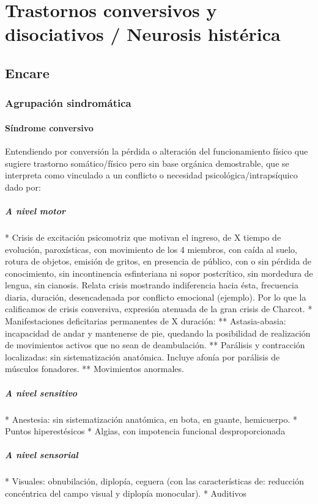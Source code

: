 \chapter*{Trastornos conversivos y disociativos / Neurosis histérica}
\section*{Encare}
\subsection*{Agrupación sindromática}
\subsubsection*{Síndrome conversivo}
Entendiendo por conversión la pérdida o alteración del funcionamiento físico que sugiere trastorno somático/físico pero sin base orgánica demostrable, que se interpreta como vinculado a un conflicto o necesidad psicológica/intrapsíquico dado por:
\paragraph{A nivel motor}
* Crisis de excitación psicomotriz que motivan el ingreso, de X tiempo de evolución, paroxísticas, con movimiento de los 4 miembros, con caída al suelo, rotura de objetos, emisión de gritos, en presencia de público, con o sin pérdida de conocimiento, sin incontinencia esfinteriana ni sopor postcrítico, sin mordedura de lengua, sin cianosis. Relata crisis mostrando indiferencia hacia ésta, frecuencia diaria, duración, desencadenada por conflicto emocional (ejemplo). Por lo que la calificamos de crisis conversiva, expresión atenuada de la gran crisis de Charcot.
* Manifestaciones deficitarias permanentes de X duración:
** Astasia-abasia: incapacidad de andar y mantenerse de pie, quedando la posibilidad de realización de movimientos activos que no sean de deambulación.
** Parálisis y contracción localizadas: sin sistematización anatómica. Incluye afonía por parálisis de músculos fonadores.
** Movimientos anormales.
\paragraph{A nivel sensitivo}
* Anestesia: sin sistematización anatómica, en bota, en guante, hemicuerpo.
* Puntos hiperestésicos
* Algias, con impotencia funcional desproporcionada
\paragraph{A nivel sensorial}
* Visuales: obnubilación, diplopía, ceguera (con las características de: reducción concéntrica del campo visual y diplopía monocular).
* Auditivos
